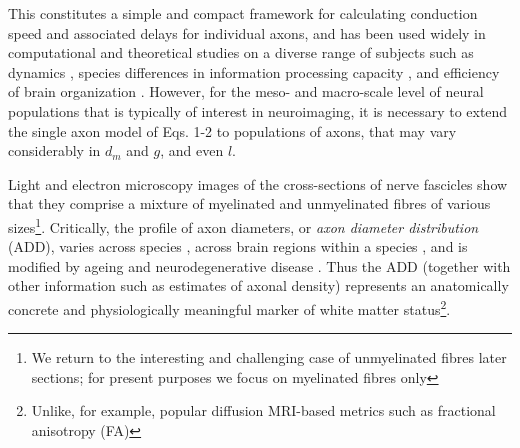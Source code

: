 

This constitutes a simple and compact framework for calculating conduction speed and associated delays for individual axons, and has been used widely in computational and theoretical studies on a diverse range of subjects such as dynamics \citep{bojak2010axonal}, species differences in information processing capacity \citep{caminiti2009evolution}, and efficiency of brain organization \citep{chomiak2009what}. However, for the meso- and macro-scale level of neural populations that is typically of interest in neuroimaging, it is necessary to extend the single axon model of Eqs. 1-2 to  populations of axons, that may vary considerably in $d_m$ and $g$, and even $l$. 

Light and electron microscopy images of the cross-sections of nerve fascicles show that they comprise a mixture of myelinated and unmyelinated fibres of various sizes\footnote{We return to the interesting and challenging case of unmyelinated fibres later sections; for present purposes we focus on myelinated fibres only}. Critically, the profile of axon diameters, or \textit{axon diameter distribution} (ADD), varies across species \citep{caminiti2013diameter}, across brain regions within a species \citep{aboitiz1992fiber,innocenti2010fiber}, and is modified by ageing and neurodegenerative disease \citep{peters2009the}. Thus the ADD (together with other information such as estimates of axonal density) represents an anatomically concrete and physiologically meaningful marker of white matter status\footnote{Unlike, for example, popular diffusion MRI-based metrics such as fractional anisotropy (FA)}. 
